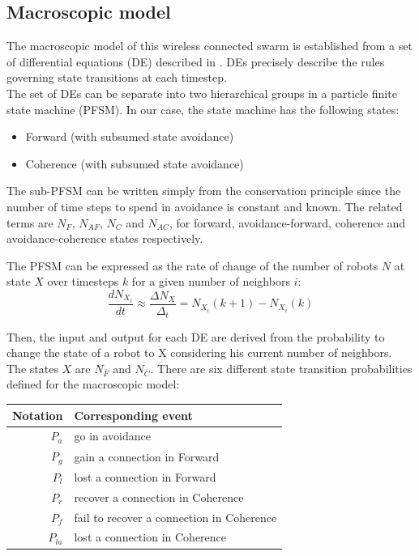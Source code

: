 \documentclass[a4paper, 10pt, conference]{ieeeconf}
\begin{document}
  \subsection{Macroscopic model}
  The macroscopic model of this wireless connected swarm is established from a set of differential equations (DE) described in \cite{Winfield08}. DEs precisely describe the rules governing state transitions at each timestep.\\

  The set of DEs can be separate into two hierarchical groups in a particle finite state machine (PFSM). In our case, the state machine has the following states:\\
  \begin{itemize}
    \item Forward (with subsumed state avoidance)
    \item Coherence (with subsumed state avoidance)
  \end{itemize}

  The sub-PFSM can be written simply from the conservation principle since the number of time steps to spend in avoidance is constant and known. The related terms are $N_F$, $N_{AF}$, $N_C$ and $N_{AC}$, for forward, avoidance-forward, coherence and avoidance-coherence states respectively.

  The PFSM can be expressed as the rate of change of the number of robots $N$ at state $X$ over timesteps $k$ for a given number of neighbors $i$:
  \[
    \frac{dN_{X_i}}{dt} \approx \frac{\Delta N_X}{\Delta_t} = N_{X_i}(k+1) - N_{X_i}(k)
  \]

  Then, the input and output for each DE are derived from the probability to change the state of a robot to X considering his current number of neighbors. The states $X$ are $N_{\bar F}$ and $N_{\bar C}$. There are six different state transition probabilities defined for the macroscopic model:

  \begin{table}[h]
    \begin{center}
      \begin{tabular}{r|l}
        \hline
        Notation   & Corresponding event \\
        \hline
        $P_a$      & go in avoidance \\
        $P_g$      & gain a connection in Forward \\
        $P_l$      & lost a connection in Forward \\
        $P_r$      & recover a connection in Coherence \\
        $P_f$      & fail to recover a connection in Coherence \\
        $P_{la}$   & lost a connection in Coherence \\
        \hline
      \end{tabular}
    \end{center}
  \end{table}
\end{document}
